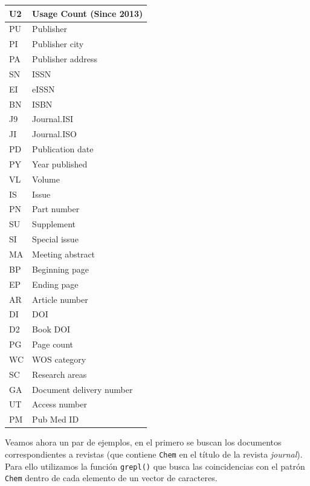 \documentclass[
]{book}
\newenvironment{Shaded}{\begin{snugshade}}{\end{snugshade}}
\newcommand{\CommentTok}[1]{\textcolor[rgb]{0.56,0.35,0.01}{\textit{#1}}}
\newcommand{\FunctionTok}[1]{\textcolor[rgb]{0.13,0.29,0.53}{\textbf{#1}}}
\newcommand{\NormalTok}[1]{#1}
\newcommand{\OtherTok}[1]{\textcolor[rgb]{0.56,0.35,0.01}{#1}}
\newcommand{\SpecialCharTok}[1]{\textcolor[rgb]{0.81,0.36,0.00}{\textbf{#1}}}
\newcommand{\StringTok}[1]{\textcolor[rgb]{0.31,0.60,0.02}{#1}}
\begin{document}
\begin{table}
\begin{tabular}[t]{l|l}
\hline
U2 & Usage Count (Since 2013)\\
\hline
PU & Publisher\\
\hline
PI & Publisher city\\
\hline
PA & Publisher address\\
\hline
SN & ISSN\\
\hline
EI & eISSN\\
\hline
BN & ISBN\\
\hline
J9 & Journal.ISI\\
\hline
JI & Journal.ISO\\
\hline
PD & Publication date\\
\hline
PY & Year published\\
\hline
VL & Volume\\
\hline
IS & Issue\\
\hline
PN & Part number\\
\hline
SU & Supplement\\
\hline
SI & Special issue\\
\hline
MA & Meeting abstract\\
\hline
BP & Beginning page\\
\hline
EP & Ending page\\
\hline
AR & Article number\\
\hline
DI & DOI\\
\hline
D2 & Book DOI\\
\hline
PG & Page count\\
\hline
WC & WOS category\\
\hline
SC & Research areas\\
\hline
GA & Document delivery number\\
\hline
UT & Access number\\
\hline
PM & Pub Med ID\\
\hline
\end{tabular}
\end{table}

Veamos ahora un par de ejemplos, en el primero se buscan los documentos correspondientes a revistas (que contiene \texttt{Chem} en el título de la revista \emph{journal}). Para ello utilizamos la función \texttt{grepl()} que busca las coincidencias con el patrón \texttt{Chem} dentro de cada elemento de un vector de caracteres.

\begin{Shaded}
\end{Shaded}
\end{document}
